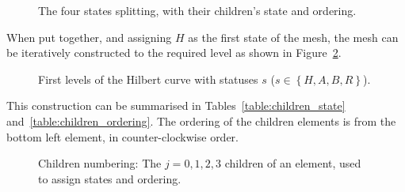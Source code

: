 \begin{figure}[H]
	\centering
	\hfill
	\hfill
	\hfill
	\caption{The four states splitting, with their children's state and ordering.}\label{fig:hilbert_splits}
\end{figure}

When put together, and assigning \(H\) as the first state of the mesh, the mesh can be iteratively
constructed to the required level as shown in Figure~\ref{fig:hilbert_levels}.

\begin{figure}[H]
	\centering
	\subfloat[Level 0]
	{\label{fig:hilbert_l0}}
	\hfill
	\subfloat[Level 1]
	{\label{fig:hilbert_l1}}
	\hfill
	\subfloat[Level 2]
	{\label{fig:hilbert_l2}}
	\caption{First levels of the Hilbert curve with statuses \(s\) (\(s \in \left \{ H, A , B , R \right \} \)).}\label{fig:hilbert_levels}
\end{figure}

This construction can be summarised in Tables~\ref{table:children_state}
and~\ref{table:children_ordering}. The ordering of the children elements is from the bottom left
element, in counter-clockwise order. 

\begin{figure}[H]
	\centering
	
	\caption{Children numbering: The \(j = 0, 1, 2, 3\) children of an element, used to assign states and ordering.}\label{fig:child_order}
\end{figure}

